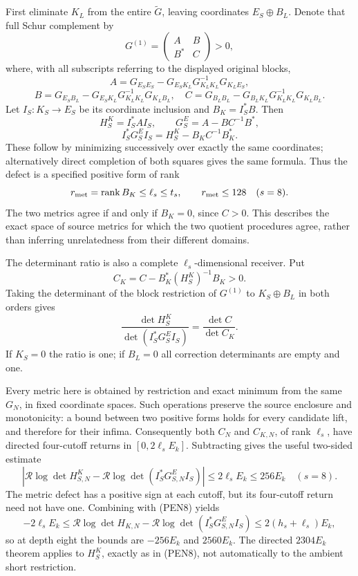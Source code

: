 \documentclass[11pt]{article}
\begin{document}
First eliminate \(K_L\) from the entire \(\widetilde G\), leaving coordinates \(E_S\oplus B_L\). Denote that full Schur complement by \[
G^{(1)}=
\begin{pmatrix}A&B\\B^*&C\end{pmatrix}>0,
\] where, with all subscripts referring to the displayed original blocks, \[
A=G_{E_SE_S}-G_{E_SK_L}G_{K_LK_L}^{-1}G_{K_LE_S},
\] \[
B=G_{E_SB_L}-G_{E_SK_L}G_{K_LK_L}^{-1}G_{K_LB_L},
\quad
C=G_{B_LB_L}-G_{B_LK_L}G_{K_LK_L}^{-1}G_{K_LB_L}. \tag{PEN17}
\] Let \(I_S:K_S\to E_S\) be its coordinate inclusion and \(B_K=I_S^*B\). Then \[
H_S^K=I_S^*AI_S,\qquad
G_S^E=A-BC^{-1}B^*,
\] \[
\boxed{I_S^*G_S^EI_S
=H_S^K-B_KC^{-1}B_K^*.} \tag{PEN18}
\] These follow by minimizing successively over exactly the same coordinates; alternatively direct completion of both squares gives the same formula. Thus the defect is a specified positive form of rank \[
r_{\rm met}=\operatorname{rank}B_K\le\ell_s\le t_s,\qquad r_{\rm met}\le128\quad(s=8).
\] The two metrics agree if and only if \(B_K=0\), since \(C>0\). This describes the exact space of source metrics for which the two quotient procedures agree, rather than inferring unrelatedness from their different domains.

The determinant ratio is also a complete \(\ell_s\)-dimensional receiver. Put \[
C_K=C-B_K^*(H_S^K)^{-1}B_K>0.
\] Taking the determinant of the block restriction of \(G^{(1)}\) to \(K_S\oplus B_L\) in both orders gives \[
\frac{\det H_S^K}{\det(I_S^*G_S^EI_S)}
=\frac{\det C}{\det C_K}. \tag{PEN19}
\] If \(K_S=0\) the ratio is one; if \(B_L=0\) all correction determinants are empty and one.

Every metric here is obtained by restriction and exact minimum from the same \(G_N\), in fixed coordinate spaces. Such operations preserve the source enclosure and monotonicity: a bound between two positive forms holds for every candidate lift, and therefore for their infima. Consequently both \(C_N\) and \(C_{K,N}\), of rank \(\ell_s\), have directed four-cutoff returns in \([0,2\ell_sE_k]\). Subtracting gives the useful two-sided estimate \[
\left|\mathcal R\log\det H_{S,N}^K
-\mathcal R\log\det(I_S^*G_{S,N}^EI_S)\right|
\le2\ell_sE_k\le256E_k\quad(s=8). \tag{PEN20}
\] The metric defect has a positive sign at each cutoff, but its four-cutoff return need not have one. Combining with (PEN8) yields \[
-2\ell_sE_k\le
\mathcal R\log\det H_{K,N}
-\mathcal R\log\det(I_S^*G_{S,N}^EI_S)
\le2(h_s+\ell_s)E_k,
\] so at depth eight the bounds are \(-256E_k\) and \(2560E_k\). The directed \(2304E_k\) theorem applies to \(H_S^K\), exactly as in (PEN8), not automatically to the ambient short restriction.
\end{document}
